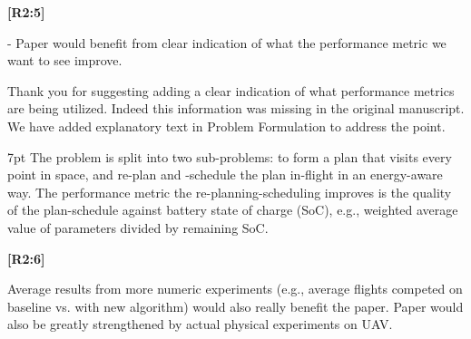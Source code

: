 \documentclass[10pt]{letter}
\newenvironment{formal}{%
  \def\FrameCommand{%
    \hspace{1pt}%
    {\color{red}\vrule width 2pt}%
    {\color{formalshade}\vrule width 4pt}%
    \colorbox{formalshade}%
  }%
  \MakeFramed{\advance\hsize-\width\FrameRestore}%
  \noindent\hspace{-4.55pt}%
  \begin{adjustwidth}{}{7pt}%
  \vspace{2pt}\vspace{2pt}%
}
{%
  \vspace{2pt}\end{adjustwidth}\endMakeFramed%
}
\begin{document}
{\hspace*{-4.5em}\textbf{[R2:5]}\vspace*{-1.9em}}

- Paper would benefit from clear indication of what the performance metric we want to see improve. 
  
{\color{blue} 
  
{\hspace*{-4.5em}{[R2:5]}\vspace*{-1.9em}}
  
Thank you for suggesting adding a clear indication of what performance metrics are being utilized. Indeed this information was missing in the original manuscript. We have added explanatory text in Problem Formulation to address the point.

\begin{formal}\color{black}
  The problem %
  is {\color{blue}split into }%
  two sub-problems{\color{blue}: }%
  to form a %
  plan that visits every point in space, {\color{blue}and }%
  re-plan and -schedule the plan in-flight in an energy-aware way. %
  {\color{blue} The performance metric the re-planning-scheduling %
  improves is %
  the quality of the plan-schedule against battery state of charge (SoC), e.g., weighted average value of parameters divided by remaining %
  SoC.%
\vspace*{1ex}
}
\end{formal}
}

  {\hspace*{-4.5em}\textbf{[R2:6]}\vspace*{-1.9em}}

  Average results from more numeric experiments (e.g., average flights competed on baseline vs. with new algorithm) would also really benefit the paper. Paper would also be greatly strengthened by actual physical experiments on UAV.
  
\end{document}
